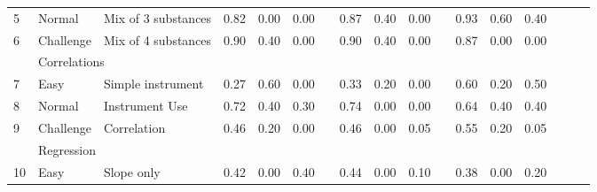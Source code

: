 \documentclass{article}
\begin{document}
\begin{table}[!t]
\begin{tabular}{lllccc c ccc c ccc ccc}
\rowcolor[HTML]{FFFFFF} 
5  & Normal & Mix of 3 substances & \cellcolor[HTML]{9847c2}0.82 & \cellcolor[HTML]{ffffff}0.00 & \cellcolor[HTML]{ffffff}0.00 & & \cellcolor[HTML]{913cbe}0.87 & \cellcolor[HTML]{a5c9e1}0.40 & \cellcolor[HTML]{ffffff}0.00 & & \cellcolor[HTML]{892eb9}0.93 & \cellcolor[HTML]{79add2}0.60 & \cellcolor[HTML]{abd9ab}0.40 \\ 
\rowcolor[HTML]{FFFFFF} 
6  & Challenge & Mix of 4 substances & \cellcolor[HTML]{8d35bb}0.90 & \cellcolor[HTML]{a5c9e1}0.40 & \cellcolor[HTML]{ffffff}0.00 & & \cellcolor[HTML]{8d35bb}0.90 & \cellcolor[HTML]{a5c9e1}0.40 & \cellcolor[HTML]{ffffff}0.00 & & \cellcolor[HTML]{913cbe}0.87 & \cellcolor[HTML]{ffffff}0.00 & \cellcolor[HTML]{ffffff}0.00 \\ \hline
\rowcolor[HTML]{F3F3F3} 
\multicolumn{2}{l}{\textbf{Archaeology}} & \multicolumn{11}{l}{Correlations} &  \\ 
\rowcolor[HTML]{F3F3F3} 
7  & Easy & Simple instrument & \cellcolor[HTML]{ddc2eb}0.27 & \cellcolor[HTML]{79add2}0.60 & \cellcolor[HTML]{ffffff}0.00 & & \cellcolor[HTML]{d5b5e6}0.33 & \cellcolor[HTML]{d2e4f0}0.20 & \cellcolor[HTML]{ffffff}0.00 & & \cellcolor[HTML]{b379d2}0.60 & \cellcolor[HTML]{d2e4f0}0.20 & \cellcolor[HTML]{95cf95}0.50 \\ 
\rowcolor[HTML]{F3F3F3} 
8  & Normal & Instrument Use & \cellcolor[HTML]{a45dc9}0.72 & \cellcolor[HTML]{a5c9e1}0.40 & \cellcolor[HTML]{c0e3c0}0.30 & & \cellcolor[HTML]{a259c7}0.74 & \cellcolor[HTML]{ffffff}0.00 & \cellcolor[HTML]{ffffff}0.00 & & \cellcolor[HTML]{ae70cf}0.64 & \cellcolor[HTML]{a5c9e1}0.40 & \cellcolor[HTML]{abd9ab}0.40 \\ 
\rowcolor[HTML]{F3F3F3} 
9  & Challenge & Correlation & \cellcolor[HTML]{c598dd}0.46 & \cellcolor[HTML]{d2e4f0}0.20 & \cellcolor[HTML]{ffffff}0.00 & & \cellcolor[HTML]{c598dd}0.46 & \cellcolor[HTML]{ffffff}0.00 & \cellcolor[HTML]{f5fbf5}0.05 & & \cellcolor[HTML]{ba84d6}0.55 & \cellcolor[HTML]{d2e4f0}0.20 & \cellcolor[HTML]{f5fbf5}0.05 \\ \hline
\rowcolor[HTML]{FFFFFF} 
\multicolumn{2}{l}{\textbf{Reactor Lab}} & \multicolumn{11}{l}{Regression} &  \\ 
\rowcolor[HTML]{FFFFFF} 
10  & Easy & Slope only & \cellcolor[HTML]{caa1e0}0.42 & \cellcolor[HTML]{ffffff}0.00 & \cellcolor[HTML]{abd9ab}0.40 & & \cellcolor[HTML]{c89dde}0.44 & \cellcolor[HTML]{ffffff}0.00 & \cellcolor[HTML]{eaf6ea}0.10 & & \cellcolor[HTML]{cfaae2}0.38 & \cellcolor[HTML]{ffffff}0.00 & \cellcolor[HTML]{d5ecd5}0.20 \\ 

\end{tabular}
\end{table}
\end{document}
